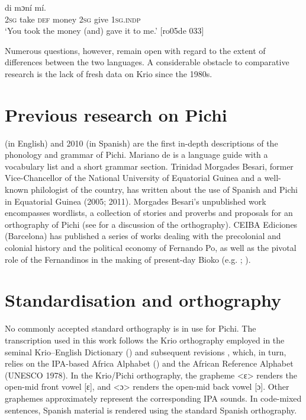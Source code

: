 \ea%
    \label{ex:1:21}
    \gll   {}      di  mɔní      mí.\\
\textsc{2sg}  take    \textsc{def}  money  \textsc{2sg}  give  \textsc{1sg.indp}\\

\glt ‘You took the money (and) gave it to me.’ [ro05de 033]
\z

Numerous questions, however, remain open with regard to the extent of differences between the two languages. A considerable obstacle to comparative research is the lack of fresh data on Krio since the 1980s.

\section{Previous research on Pichi}\label{sec:1.5}

\citealt{Yakpo2009a} (in English) and 2010 (in Spanish) are the first in-depth descriptions of the phonology and grammar of Pichi. Mariano de \citet{Zarco1938} is a language guide with a vocabulary list and a short grammar section. Trinidad Morgades Besari, former Vice-Chancellor of the National University of Equatorial Guinea and a well-known philologist of the country, has written about the use of Spanish and Pichi in Equatorial Guinea (2005; 2011). Morgades Besari’s unpublished work encompasses wordlists, a collection of stories and proverbs and proposals for an orthography of Pichi (see \citealt{Yakpo2011} for a discussion of the orthography). CEIBA Ediciones (Barcelona) has published a series of works dealing with the precolonial and colonial history and the political economy of Fernando Po, as well as the pivotal role of the Fernandinos in the making of present-day Bioko (e.g. \citealt{MartindelMolino1993}; \citealt{Cantús2006}).

\section{Standardisation and orthography}\label{sec:1.6}

No commonly accepted standard orthography is in use for Pichi. The transcription used in this work follows the Krio orthography employed in the seminal Krio–English Dictionary (\citealt{FyleJones1980}) and subsequent revisions \citep{Coomber1992}, which, in turn, relies on the IPA-based Africa Alphabet (\citealt{InternationalAfricanInstitute1930}) and the African Reference Alphabet (UNESCO 1978). In the Krio/Pichi orthography, the grapheme <ɛ> renders the open-mid front vowel [ɛ], and <ɔ> renders the open-mid back vowel [ɔ]. Other graphemes approximately represent the corresponding IPA sounds. In code-mixed sentences, Spanish material is rendered using the standard Spanish orthography. 


